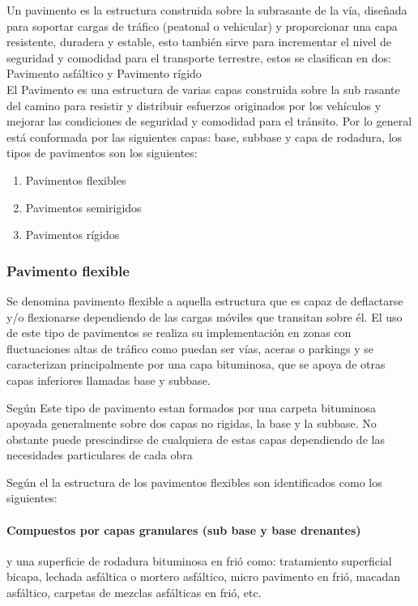 Un pavimento es la estructura construida sobre la subrasante de la vía, diseñada para soportar cargas de tráfico (peatonal o vehicular) y proporcionar una capa resistente, duradera y estable, esto también sirve para incrementar el nivel de seguridad y comodidad para el transporte terrestre, estos se clasifican en dos: Pavimento asfáltico y Pavimento rígido \\
\textcite{ManualSuelos2014} El Pavimento es una estructura de varias capas construida sobre la sub rasante del camino para resistir y distribuir esfuerzos originados por los vehículos y mejorar las condiciones de seguridad y comodidad para el tránsito. Por lo general está conformada por las siguientes capas: base, subbase y capa de rodadura, los tipos de pavimentos son los siguientes:

\begin{enumerate}
	\item Pavimentos flexibles
	\item Pavimentos semirigidos
	\item Pavimentos rígidos
\end{enumerate}

\subsubsection{Pavimento flexible}

\noindent Se denomina pavimento flexible a aquella estructura que es capaz de deflactarse y/o flexionarse dependiendo de las cargas móviles que transitan sobre él. El uso de este tipo de pavimentos se realiza su implementación en zonas con fluctuaciones altas de tráfico como puedan ser vías, aceras o parkings y se caracterizan principalmente por una capa bituminosa, que se apoya de otras capas inferiores llamadas base y subbase.

\noindent Según \textcite{alfonso2001} Este tipo de pavimento estan formados por una carpeta bituminosa apoyada generalmente sobre dos capas no rigidas, la base y la subbase. No obstante puede prescindirse de cualquiera de estas capas dependiendo de las necesidades particulares de cada obra


\noindent Según el \textcite{ManualSuelos2014} la estructura de los pavimentos flexibles son identificados como los siguientes:

\paragraph{Compuestos por capas granulares (sub base y base drenantes)} y una superficie de rodadura bituminosa en frió como: tratamiento superficial bicapa, lechada asfáltica o mortero asfáltico, micro pavimento en frió, macadan asfáltico, carpetas de mezclas asfálticas en frió, etc.
